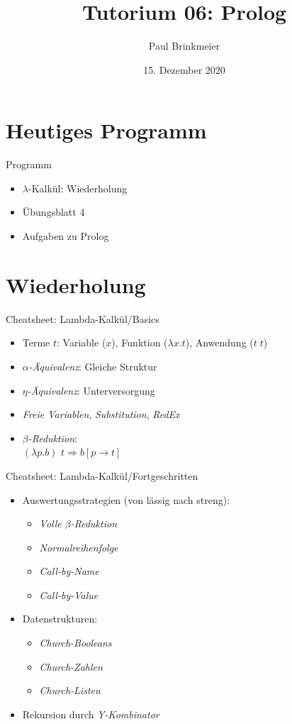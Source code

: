 \documentclass{beamer}
\title{Tutorium 06: Prolog}
\author{Paul Brinkmeier}
\institute{Tutorium Programmierparadigmen am KIT}
\date{15. Dezember 2020}
\begin{document}
\begin{frame}
	\titlepage
\end{frame}

\section{Heutiges Programm}

\begin{frame}{Programm}
	\begin{itemize}
		\item $\lambda$-Kalkül: Wiederholung
		\item Übungsblatt 4
                \item Aufgaben zu Prolog
	\end{itemize}
\end{frame}

\section{Wiederholung}

\begin{frame}{Cheatsheet: Lambda-Kalkül/Basics}
  \begin{itemize}
    \item Terme $t$: Variable ($x$), Funktion ($\lambda x . t$), Anwendung ($t \; t$)
    \item \emph{$\alpha$-Äquivalenz}: Gleiche Struktur
    \item \emph{$\eta$-Äquivalenz}: Unterversorgung
    \item \emph{Freie Variablen}, \emph{Substitution}, \emph{RedEx}
    \item \emph{$\beta$-Reduktion}: \\
          $(\lambda{}p.b)$ $t \Rightarrow b\left[p\rightarrow{}t\right]$
  \end{itemize}
\end{frame}


\begin{frame}{Cheatsheet: Lambda-Kalkül/Fortgeschritten}
  \begin{itemize}
    \item Auswertungsstrategien (von lässig nach streng):
    \begin{itemize}
      \item \emph{Volle $\beta$-Reduktion}
      \item \emph{Normalreihenfolge}
      \item \emph{Call-by-Name}
      \item \emph{Call-by-Value}
    \end{itemize}
    \item Datenstrukturen:
    \begin{itemize}
      \item \emph{Church-Booleans}
      \item \emph{Church-Zahlen}
      \item \emph{Church-Listen}
    \end{itemize}
    \item Rekursion durch \emph{Y-Kombinator}
  \end{itemize}
\end{frame}
\end{document}
